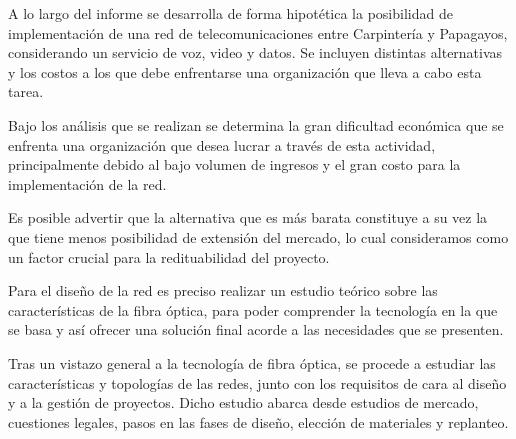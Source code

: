A lo largo del informe se desarrolla de forma hipotética la posibilidad de implementación de una red de telecomunicaciones entre Carpintería y Papagayos, considerando un servicio de voz, video y datos. Se incluyen distintas alternativas y los costos a los que debe enfrentarse una organización que lleva a cabo esta tarea.

Bajo los análisis que se realizan se determina la gran dificultad económica que se enfrenta una organización que desea lucrar a través de esta actividad, principalmente debido al bajo volumen de ingresos y el gran costo para la implementación de la red.

Es posible advertir que la alternativa que es más barata constituye a su vez la que tiene menos posibilidad de extensión del mercado, lo cual consideramos como un factor crucial para la redituabilidad del proyecto.


Para el diseño de la red es preciso realizar un estudio teórico sobre las características de la fibra óptica, para poder comprender la tecnología en la que se basa y así ofrecer una solución final acorde a las necesidades que se presenten. 


Tras un vistazo general a la tecnología de fibra óptica, se procede a estudiar las características y topologías de las redes, junto con los requisitos de cara al diseño y a la gestión de proyectos. Dicho estudio abarca desde estudios
de mercado, cuestiones legales, pasos en las fases de diseño, elección de materiales y replanteo. 


